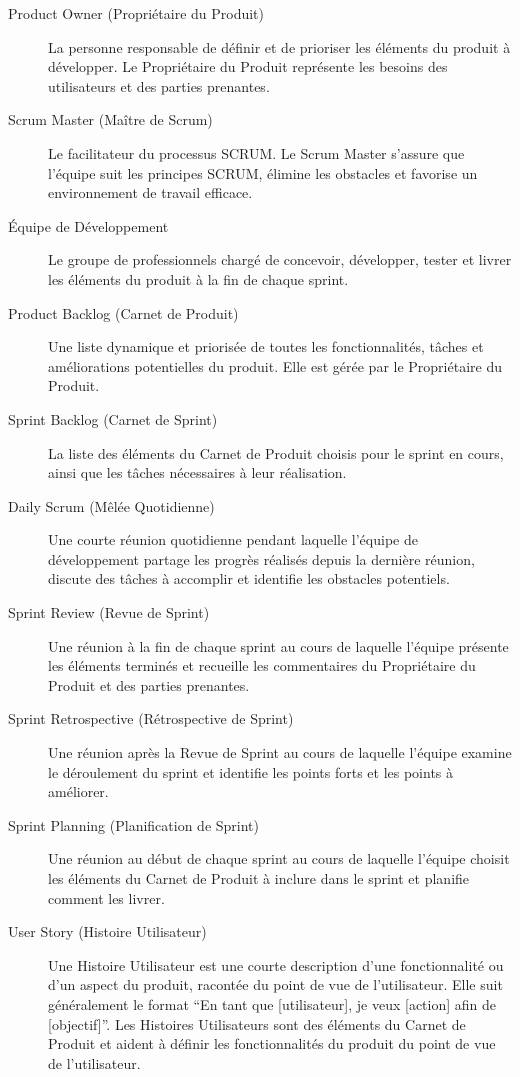 \begin{description}
    \item[Product Owner (Propriétaire du Produit)] La personne responsable de définir et de prioriser les éléments du produit à développer. Le Propriétaire du Produit représente les besoins des utilisateurs et des parties prenantes.
    \item[Scrum Master (Maître de Scrum)] Le facilitateur du processus SCRUM. Le Scrum Master s'assure que l'équipe suit les principes SCRUM, élimine les obstacles et favorise un environnement de travail efficace.
    \item[Équipe de Développement] Le groupe de professionnels chargé de concevoir, développer, tester et livrer les éléments du produit à la fin de chaque sprint.
    \item[Product Backlog (Carnet de Produit)] Une liste dynamique et priorisée de toutes les fonctionnalités, tâches et améliorations potentielles du produit. Elle est gérée par le Propriétaire du Produit.
    \item[Sprint Backlog (Carnet de Sprint)] La liste des éléments du Carnet de Produit choisis pour le sprint en cours, ainsi que les tâches nécessaires à leur réalisation.
    \item[Daily Scrum (Mêlée Quotidienne)] Une courte réunion quotidienne pendant laquelle l'équipe de développement partage les progrès réalisés depuis la dernière réunion, discute des tâches à accomplir et identifie les obstacles potentiels.
    \item[Sprint Review (Revue de Sprint)] Une réunion à la fin de chaque sprint au cours de laquelle l'équipe présente les éléments terminés et recueille les commentaires du Propriétaire du Produit et des parties prenantes.
    \item[Sprint Retrospective (Rétrospective de Sprint)] Une réunion après la Revue de Sprint au cours de laquelle l'équipe examine le déroulement du sprint et identifie les points forts et les points à améliorer.
    \item[Sprint Planning (Planification de Sprint)] Une réunion au début de chaque sprint au cours de laquelle l'équipe choisit les éléments du Carnet de Produit à inclure dans le sprint et planifie comment les livrer.
    \item[User Story (Histoire Utilisateur)] Une Histoire Utilisateur est une courte description d'une fonctionnalité ou d'un aspect du produit, racontée du point de vue de l'utilisateur. Elle suit généralement le format ``En tant que [utilisateur], je veux [action] afin de [objectif]''. Les Histoires Utilisateurs sont des éléments du Carnet de Produit et aident à définir les fonctionnalités du produit du point de vue de l'utilisateur.

\end{description}
